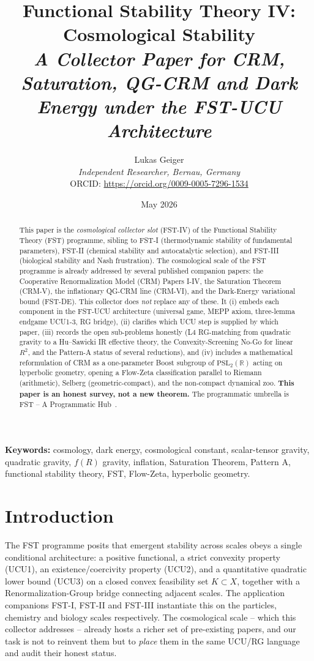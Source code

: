 \documentclass[11pt,a4paper]{article}
\title{Functional Stability Theory IV:\\
Cosmological Stability\\
\large\textit{A Collector Paper for CRM, Saturation,
QG-CRM and Dark Energy under the FST-UCU Architecture}}
\author{Lukas Geiger\\
\textit{Independent Researcher, Bernau, Germany}\\
ORCID: \url{https://orcid.org/0009-0005-7296-1534}}
\date{May 2026}
\theoremstyle{remark}
\begin{document}
\maketitle

\begin{abstract}
\noindent
This paper is the \emph{cosmological collector slot} (FST-IV) of the
Functional Stability Theory (FST) programme, sibling to FST-I
(thermodynamic stability of fundamental parameters), FST-II (chemical
stability and autocatalytic selection), and FST-III (biological
stability and Nash frustration). The cosmological scale of the FST
programme is already addressed by several published companion papers:
the Cooperative Renormalization Model (CRM) Papers I-IV, the Saturation
Theorem (CRM-V), the inflationary QG-CRM line (CRM-VI), and the
Dark-Energy variational bound (FST-DE). This collector does \emph{not}
replace any of these. It (i) embeds each component in the FST-UCU
architecture (universal game, MEPP axiom, three-lemma endgame UCU1-3,
RG bridge), (ii) clarifies which UCU step is supplied by which paper,
(iii) records the open sub-problems honestly (L4 RG-matching from
quadratic gravity to a Hu--Sawicki IR effective theory, the
Convexity-Screening No-Go for linear $R^2$, and the Pattern-A status
of several reductions), and (iv) includes a mathematical reformulation
of CRM as a one-parameter Boost subgroup of $\mathrm{PSL}_2(\mathbb{R})$
acting on hyperbolic geometry, opening a Flow-Zeta classification
parallel to Riemann (arithmetic), Selberg (geometric-compact), and the
non-compact dynamical zoo. \textbf{This paper is an honest survey, not
a new theorem.} The programmatic umbrella is FST -- A Programmatic
Hub~\cite{GeigerFST-Hub-2026}.
\end{abstract}

\textbf{Keywords:} cosmology, dark energy, cosmological constant,
scalar-tensor gravity, quadratic gravity, $f(R)$ gravity, inflation,
Saturation Theorem, Pattern A, functional stability theory, FST,
Flow-Zeta, hyperbolic geometry.

\section{Introduction}
\label{sec:intro}

The FST programme posits that emergent stability across scales obeys
a single conditional architecture: a positive functional, a strict
convexity property (UCU1), an existence/coercivity property (UCU2),
and a quantitative quadratic lower bound (UCU3) on a closed convex
feasibility set $K \subset X$, together with a Renormalization-Group
bridge connecting adjacent scales. The application companions FST-I,
FST-II and FST-III instantiate this on the particles, chemistry and
biology scales respectively. The cosmological scale -- which this
collector addresses -- already hosts a richer set of pre-existing
papers, and our task is not to reinvent them but to \emph{place} them
in the same UCU/RG language and audit their honest status.
\end{document}
